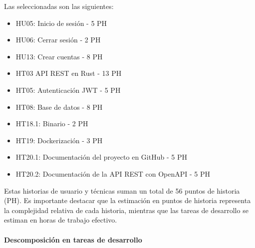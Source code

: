 Las seleccionadas son las siguientes:
\begin{itemize}
    \item HU05: Inicio de sesión - 5 PH
    \item HU06: Cerrar sesión - 2 PH
    \item HU13: Crear cuentas - 8 PH
    \item HT03 API REST en Rust - 13 PH
    \item HT05: Autenticación JWT - 5 PH
    \item HT08: Base de datos - 8 PH
    \item HT18.1: Binario - 2 PH
    \item HT19: Dockerización - 3 PH
    \item HT20.1: Documentación del proyecto en GitHub - 5 PH
    \item HT20.2: Documentación de la API REST con OpenAPI - 5 PH
\end{itemize}

Estas historias de usuario y técnicas suman un total de 56 puntos de historia (PH). Es importante destacar que la estimación en puntos de historia representa la complejidad relativa de cada historia, mientras que las tareas de desarrollo se estiman en horas de trabajo efectivo.

\paragraph{Descomposición en tareas de desarrollo}

